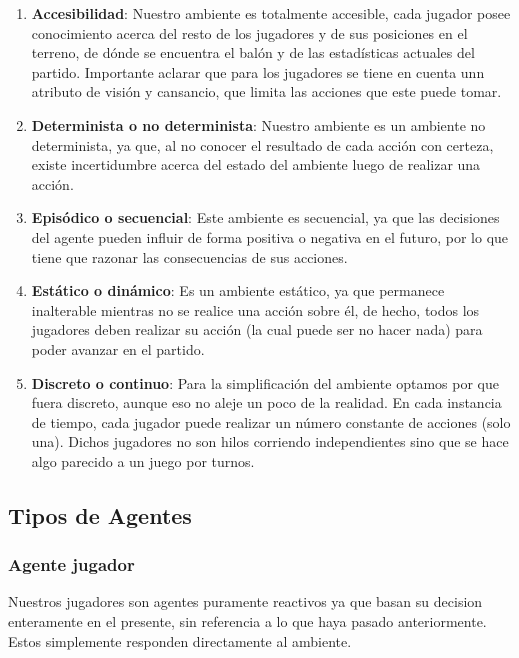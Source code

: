 \documentclass{article}
\begin{document}
\begin{enumerate}
    \item \textbf{Accesibilidad}: Nuestro ambiente es totalmente accesible, cada jugador posee conocimiento acerca del resto de los jugadores y de sus posiciones en el terreno, de dónde se encuentra el balón y de las estadísticas actuales del partido.
          Importante aclarar que para los jugadores se tiene en cuenta unn atributo de visión y cansancio, que limita las acciones que este puede tomar.
          
    \item \textbf{Determinista o no determinista}: Nuestro ambiente es un ambiente no determinista, ya que, al no conocer el resultado de cada acción con certeza, existe incertidumbre acerca del estado del ambiente luego de realizar una acción.
          
    \item \textbf{Episódico o secuencial}: Este ambiente es secuencial, ya que las decisiones del agente pueden influir de forma positiva o negativa en el futuro, por lo que tiene que razonar las consecuencias de sus acciones.
          
    \item \textbf{Estático o dinámico}: Es un ambiente estático, ya que permanece inalterable mientras no se realice una acción sobre él, de hecho, todos los jugadores deben realizar su acción (la cual puede ser no hacer nada) para poder avanzar en el partido.
          
    \item \textbf{Discreto o continuo}: Para la simplificación del ambiente optamos por que fuera discreto, aunque eso no aleje un poco de la realidad. En cada instancia de tiempo, cada jugador puede realizar un número constante de acciones (solo una). Dichos jugadores no son hilos corriendo independientes sino que se hace algo parecido a un juego por turnos.
\end{enumerate}

\subsection{Tipos de Agentes}
\subsubsection{Agente jugador}
Nuestros jugadores son agentes puramente reactivos ya que basan su decision enteramente en el presente, sin referencia a lo que haya pasado anteriormente. Estos simplemente responden directamente al ambiente.
\end{document}
